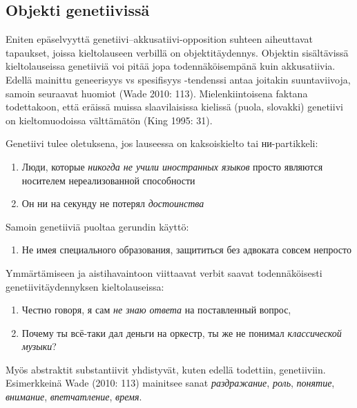 \documentclass[]{scrreprt}
\providecommand{\tightlist}{%
  \setlength{\itemsep}{0pt}\setlength{\parskip}{0pt}}
\begin{document}
\subsection{Objekti genetiivissä}\label{objekti-genetiivissuxe4}

Eniten epäselvyyttä genetiivi--akkusatiivi-opposition suhteen
aiheuttavat tapaukset, joissa kieltolauseen verbillä on
objektitäydennys. Objektin sisältävissä kieltolauseissa genetiiviä voi
pitää jopa todennäköisempänä kuin akkusatiivia. Edellä mainittu
geneerisyys vs spesifisyys -tendenssi antaa joitakin suuntaviivoja,
samoin seuraavat huomiot (Wade 2010: 113). Mielenkiintoisena faktana
todettakoon, että eräissä muissa slaavilaisissa kielissä (puola,
slovakki) genetiivi on kieltomuodoissa välttämätön (King 1995: 31).

Genetiivi tulee oletuksena, jos lauseessa on kaksoiskielto tai
ни-partikkeli:

\begin{enumerate}
\def\labelenumi{(\arabic{enumi})}
\setcounter{enumi}{62}
\tightlist
\item
  Люди, которые \emph{никогда не учили иностранных языков} просто
  являются носителем нереализованной способности
\item
  Он ни на секунду не потерял \emph{достоинства}
\end{enumerate}

Samoin genetiiviä puoltaa gerundin käyttö:

\begin{enumerate}
\def\labelenumi{(\arabic{enumi})}
\setcounter{enumi}{64}
\tightlist
\item
  Не имея специального образования, защититься без адвоката совсем
  непросто
\end{enumerate}

Ymmärtämiseen ja aistihavaintoon viittaavat verbit saavat
todennäköisesti genetiivitäydennyksen kieltolauseissa:

\begin{enumerate}
\def\labelenumi{(\arabic{enumi})}
\setcounter{enumi}{65}
\tightlist
\item
  Честно говоря, я сам \emph{не знаю ответа} на поставленный вопрос,
\item
  Почему ты всё-таки дал деньги на оркестр, ты же не понимал
  \emph{классической музыки}?
\end{enumerate}

Myös abstraktit substantiivit yhdistyvät, kuten edellä todettiin,
genetiiviin. Esimerkkeinä Wade (2010: 113) mainitsee sanat
\emph{раздражание}, \emph{роль}, \emph{понятие}, \emph{внимание},
\emph{впетчатление}, \emph{время}.
\end{document}
